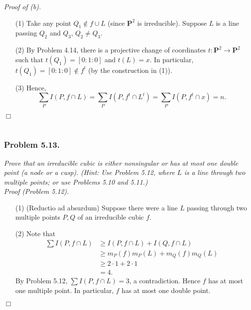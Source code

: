 \documentclass{article}
\begin{document}
\emph{Proof of (b).}
\begin{enumerate}
\item[(1)]
  Take any point $Q_1 \not\in f \cup L$
  (since $\mathbf{P}^2$ is irreducible).
  Suppose $L$ is a line passing $Q_2$ and $Q_3$, $Q_2 \neq Q_3$.

\item[(2)]
  By Problem 4.14,
  there is a projective change of coordinates $t: \mathbf{P}^2 \to \mathbf{P}^2$
  such that $t(Q_1) = [0:1:0]$ and $t(L) = x$.
  In particular, $t(Q_1) = [0:1:0] \not\in f^{t}$ (by the construction in (1)).

\item[(3)]
  Hence,
  \[
    \sum_{P} I(P, f \cap L)
    = \sum_{P} I(P, f^{t} \cap L^{t})
    = \sum_{P} I(P, f^{t} \cap x)
    = n.
  \]
\end{enumerate}
$\Box$ \\\\






\subsubsection*{Problem 5.13.}
\emph{Prove that an irreducible cubic is either nonsingular or
has at most one double point (a node or a cusp).
(Hint: Use Problem 5.12, where $L$ is a line through two
multiple points; or use Problems 5.10 and 5.11.)} \\



\emph{Proof (Problem 5.12).}
\begin{enumerate}
\item[(1)]
  (Reductio ad absurdum)
  Suppose there were a line $L$ passing through two multiple points $P, Q$
  of an irreducible cubic $f$.

\item[(2)]
  Note that
  \begin{align*}
    \sum I(P, f \cap L)
    &\geq I(P, f \cap L) + I(Q, f \cap L) \\
    &\geq m_{P}(f) m_{P}(L) + m_{Q}(f) m_{Q}(L) \\
    &\geq 2 \cdot 1 + 2 \cdot 1 \\
    &= 4.
  \end{align*}
  By Problem 5.12, $\sum I(P, f \cap L) = 3$, a contradiction.
  Hence $f$ has at most one multiple point.
  In particular, $f$ has at most one double point.
\end{enumerate}
$\Box$ \\
\end{document}
